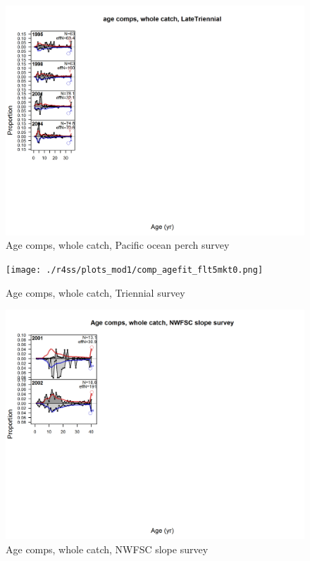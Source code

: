 \documentclass[12pt,]{article}
\begin{document}
\begin{figure}
\centering
\includegraphics{./r4ss/plots_mod1/comp_agefit_flt4mkt0.png}
\caption{Age comps, whole catch, Pacific ocean perch survey
\label{fig:age_fits}}
\end{figure}

\begin{figure}
\centering
\texttt{[image: ./r4ss/plots\_mod1/comp\_agefit\_flt5mkt0.png]}
\caption{Age comps, whole catch, Triennial survey \label{fig:age_fits}}
\end{figure}

\begin{figure}
\centering
\includegraphics{./r4ss/plots_mod1/comp_agefit_flt7mkt0.png}
\caption{Age comps, whole catch, NWFSC slope survey
\label{fig:age_fits}}
\end{figure}
\end{document}
